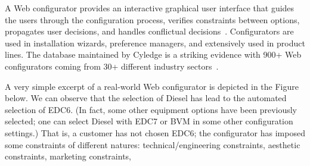 \dcs
%
 A Web configurator provides an interactive graphical user interface that guides the users through the configuration process, verifies constraints between options, propagates user decisions, and handles conflictual decisions~\cite{ebrahimCSMR2014}. %
 Configurators are used in installation wizards, preference managers, and extensively used in product lines. 
 The database maintained by Cyledge is a striking evidence with 900+ Web configurators coming from 30+ different industry sectors~\cite{configurators}. %

% 
 A very simple excerpt of a real-world Web configurator is depicted in the Figure below. %
We can observe that the selection of \textsf{Diesel} has lead to the automated selection of \textsf{EDC6}. (In fact, some other equipment options have been previously selected; one can select \textsf{Diesel} with \textsf{EDC7} or \textsf{BVM} in some other configuration settings.) 
That is, a customer has not chosen \textsf{EDC6}; the configurator has imposed some constraints of different natures: technical/engineering constraints, aesthetic constraints, marketing constraints, \etc



